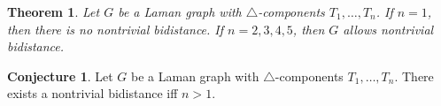 \documentclass[a4paper, 11pt]{article}
\newcommand{\trcomps}{$\triangle$-components}
\newtheorem{thm}{Theorem}[section]
\theoremstyle{definition}
\newtheorem{conj}{Conjecture}
\begin{document}
\begin{thm}
Let $G$ be a Laman graph with \trcomps{} $T_1,\dots, T_n$. If $n=1$, then there is no nontrivial bidistance. If $n=2,3,4,5$, then $G$ allows nontrivial bidistance.
\end{thm}

\begin{conj}
Let $G$ be a Laman graph with \trcomps{} $T_1,\dots, T_n$. There exists a nontrivial bidistance iff $n>1$.
\end{conj}
\end{document}
